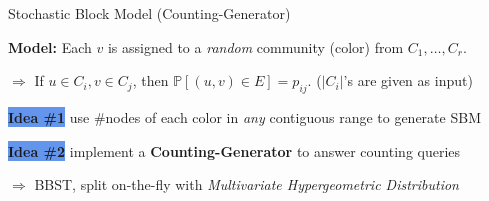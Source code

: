 \vspace{-0.3em}
\begin{block}{Stochastic Block Model (Counting-Generator)} %

\textbf{Model:} Each $v$ is assigned to a \emph{random} community (color) from $C_1, \ldots, C_r$.

\quad$\Rightarrow$ If $u\in C_i, v\in C_j$, then $\mathbb {P}[{(u, v)\in E}] = p_{ij}$.
($|C_i|$'s are given as input)

\vspace{15pt}

\colorbox{CornflowerBlue}{\textbf{Idea \#1}} use \#nodes of each color in \emph{any} contiguous range to generate SBM

\vspace{-0.5in}
\begin{figure}[h]
    \centering
\end{figure}

\colorbox{CornflowerBlue}{\textbf{Idea \#2}} implement a \textbf{Counting-Generator} to answer counting queries

\quad$\Rightarrow$ BBST, split on-the-fly with \emph{Multivariate Hypergeometric Distribution}



\end{block}

